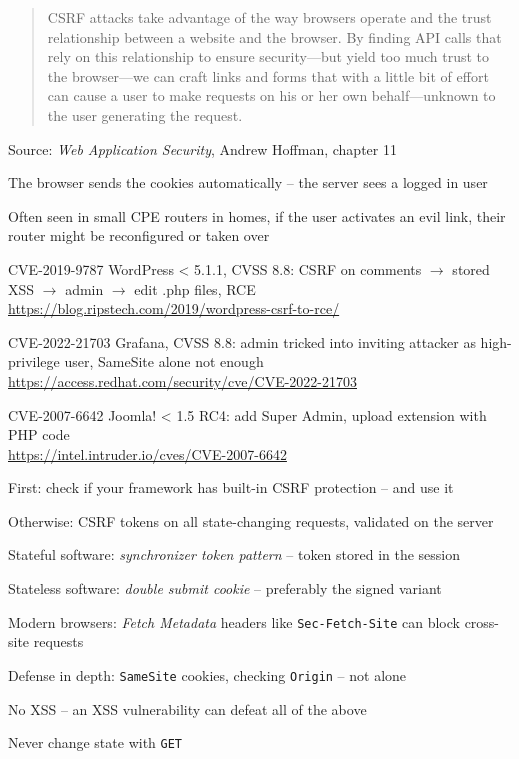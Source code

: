 \documentclass[Screen16to9,17pt]{foils}
\begin{document}

\begin{quote}
CSRF attacks take advantage of the way browsers operate and the trust relationship between a website and the browser. By finding API calls that rely on this relationship to ensure security—but yield too much trust to the browser—we can craft links and forms that with a little bit of effort can cause a user to make requests on his or her own behalf—unknown to the user generating the request.
\end{quote}
Source: \emph{Web Application Security}, Andrew Hoffman, chapter 11

\begin{list2}
\item The browser sends the cookies automatically -- the server sees a logged in user
\item Often seen in small CPE routers in homes, if the user activates an evil link, their router might be reconfigured or taken over
\end{list2}


\begin{list2}
\item CVE-2019-9787 WordPress < 5.1.1, CVSS 8.8: CSRF on comments $\rightarrow$
      stored XSS $\rightarrow$ admin $\rightarrow$ edit .php files, RCE\\
      \url{https://blog.ripstech.com/2019/wordpress-csrf-to-rce/}
\item CVE-2022-21703 Grafana, CVSS 8.8: admin tricked into inviting attacker
      as high-privilege user, SameSite alone not enough\\
      \url{https://access.redhat.com/security/cve/CVE-2022-21703}
\item CVE-2007-6642 Joomla! < 1.5 RC4: add Super Admin, upload
      extension with PHP code\\
      \url{https://intel.intruder.io/cves/CVE-2007-6642}
\end{list2}



\begin{list2}
\item First: check if your framework has built-in CSRF protection -- and use it
\item Otherwise: CSRF tokens on all state-changing requests, validated on the server
\item Stateful software: \emph{synchronizer token pattern} -- token stored in the session
\item Stateless software: \emph{double submit cookie} -- preferably the signed variant
\item Modern browsers: \emph{Fetch Metadata} headers like \verb+Sec-Fetch-Site+ can block cross-site requests
\item Defense in depth: \verb+SameSite+ cookies, checking \verb+Origin+ -- not alone
\item No XSS -- an XSS vulnerability can defeat all of the above
\item Never change state with \verb+GET+
\end{list2}
\end{document}
